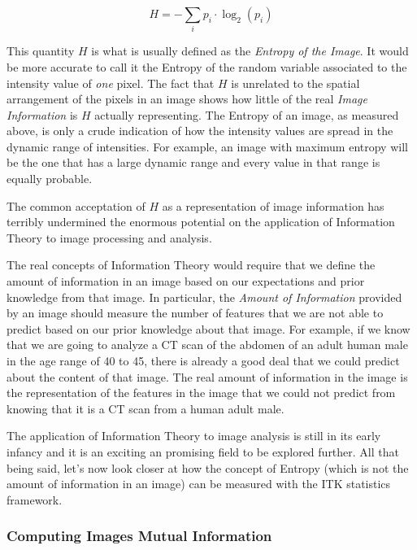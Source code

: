 \begin{equation}
H = - \sum_i{ p_i  \cdot \log_2{(p_i)} }
\end{equation}

This quantity $H$ is what is usually defined as the \emph{Entropy of the
Image}. It would be more accurate to call it the Entropy of the random variable
associated to the intensity value of \emph{one} pixel. The fact that $H$ is
unrelated to the spatial arrangement of the pixels in an image shows how little
of the real \emph{Image Information} is $H$ actually representing. The Entropy
of an image, as measured above, is only a crude indication of how the intensity
values are spread in the dynamic range of intensities. For example, an image
with maximum entropy will be the one that has a large dynamic range and every
value in that range is equally probable. 

The common acceptation of $H$ as a representation of image information has
terribly undermined the enormous potential on the application of Information
Theory to image processing and analysis.

The real concepts of Information Theory would require that we define the amount
of information in an image based on our expectations and prior knowledge from
that image. In particular, the \emph{Amount of Information} provided by an
image should measure the number of features that we are not able to predict
based on our prior knowledge about that image. For example, if we know that we
are going to analyze a CT scan of the abdomen of an adult human male in the age
range of 40 to 45, there is already a good deal that we could predict about the
content of that image.  The real amount of information in the image is the
representation of the features in the image that we could not predict from
knowing that it is a CT scan from a human adult male.

The application of Information Theory to image analysis is still in its early
infancy and it is an exciting an promising field to be explored further. All
that being said, let's now look closer at how the concept of Entropy (which is
not the amount of information in an image) can be measured with the ITK
statistics framework.

\ifitkFullVersion 

\fi

\subsubsection{Computing Images Mutual Information}
\label{sec:ComputingImagesMutualInformation}

